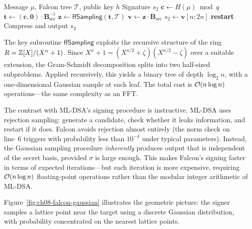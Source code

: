 \begin{algorithm}[t]
\caption{Falcon $\Sign$ (simplified)}
\label{alg:falcon-sign}
\begin{algorithmic}[1]
\Require Message $\mu$, Falcon tree $\mathcal{T}$, public key $h$
\Ensure Signature $s_2$
\State $\mathbf{c} \gets H(\mu) \bmod q$ 
\State $\mathbf{t} \gets (\mathbf{c}, \mathbf{0}) \cdot \mathbf{B}_{\mathrm{sec}}^{-1}$ 
\State $\mathbf{z} \gets \mathsf{ffSampling}(\mathbf{t}, \mathcal{T})$ 
\State $\mathbf{v} \gets \mathbf{z} \cdot \mathbf{B}_{\mathrm{sec}}$ 
\State $s_2 \gets \mathbf{v}[n{:}2n]$ 
  \State \textbf{restart} 
\EndIf
\State Compress and output $s_2$
\end{algorithmic}
\end{algorithm}

The key subroutine $\mathsf{ffSampling}$ exploits the recursive structure of the ring $R = \mathbb{Z}[X]/(X^n+1)$.  Since $X^n + 1 = (X^{n/2} + \zeta)(X^{n/2} - \zeta)$ over a suitable extension, the Gram-Schmidt decomposition splits into two half-sized subproblems.  Applied recursively, this yields a binary tree of depth $\log_2 n$, with a one-dimensional Gaussian sample at each leaf.  The total cost is $\mathcal{O}(n \log n)$ operations---the same complexity as an FFT.

The contrast with ML-DSA's signing procedure is instructive.  ML-DSA uses rejection sampling: generate a candidate, check whether it leaks information, and restart if it does.  Falcon avoids rejection almost entirely (the norm check on line~6 triggers with probability less than $10^{-4}$ under typical parameters).  Instead, the Gaussian sampling procedure \emph{inherently} produces output that is independent of the secret basis, provided $\sigma$ is large enough.  This makes Falcon's signing faster in terms of expected iterations---but each iteration is more expensive, requiring $\mathcal{O}(n \log n)$ floating-point operations rather than the modular integer arithmetic of ML-DSA.

Figure~\ref{fig:ch08-falcon-gaussian} illustrates the geometric picture: the signer samples a lattice point near the target using a discrete Gaussian distribution, with probability concentrated on the nearest lattice points.

